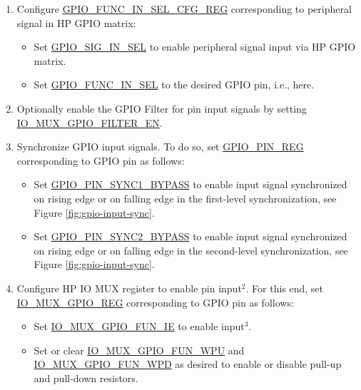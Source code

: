 \documentclass[main\_\_EN.tex]{subfiles}
\begin{document}
\begin{enumerate}
    \item Configure \hyperref[regdesc:GPIOFUNCMINSELCFGREG]{GPIO\_FUNC\_IN\_SEL\_CFG\_REG} corresponding to peripheral signal  in HP GPIO matrix:
    \begin{itemize}
        \item Set \hyperref[fielddesc:GPIOSIGNINSEL]{GPIO\_SIG\_IN\_SEL} to enable peripheral signal input via HP GPIO matrix.
        \item Set \hyperref[fielddesc:GPIOFUNCMINSEL]{GPIO\_FUNC\_IN\_SEL} to the desired GPIO pin, i.e.,  here.
    \end{itemize}
    \item \label{step:2} Optionally enable the GPIO Filter for pin input signals by setting \hyperref[fielddesc:IOMUXGPIONFILTEREN] {IO\_MUX\_GPIO\_FILTER\_EN}.
    \item \label{step:4} Synchronize GPIO input signals. To do so, set \hyperref[regdesc:GPIOPINNREG]{GPIO\_PIN\_REG} corresponding to GPIO pin  as follows:
    \begin{itemize}
        \item Set \hyperref[fielddesc:GPIOPINNSYNC1BYPASS]{GPIO\_PIN\_SYNC1\_BYPASS} to enable input signal synchronized on rising edge or on falling edge in the first-level synchronization, see Figure \ref{fig:gpio-input-sync}.
        \item Set \hyperref[fielddesc:GPIOPINNSYNC2BYPASS]{GPIO\_PIN\_SYNC2\_BYPASS} to enable input signal synchronized on rising edge or on falling edge in the second-level synchronization, see Figure \ref{fig:gpio-input-sync}.
    \end{itemize}
    \item Configure HP IO MUX register to enable pin input\hyperref[input-note-2]{$^2$}. For this end, set \hyperref[regdesc:IOMUXGPIONREG]{IO\_MUX\_GPIO\_REG} corresponding to GPIO pin  as follows:
    \begin{itemize}
        \item Set \hyperref[fielddesc:IOMUXGPIONFUNIE]{IO\_MUX\_GPIO\_FUN\_IE} to enable input\hyperref[input-note-3]{$^3$}.
        \item Set or clear \hyperref[fielddesc:IOMUXGPIONFUNWPU]{IO\_MUX\_GPIO\_FUN\_WPU} and \hyperref[fielddesc:IOMUXGPIONFUNWPD]{IO\_MUX\_GPIO\_FUN\_WPD} as desired to enable or disable pull-up and pull-down resistors.
    \end{itemize}
\end{enumerate}
\end{document}
